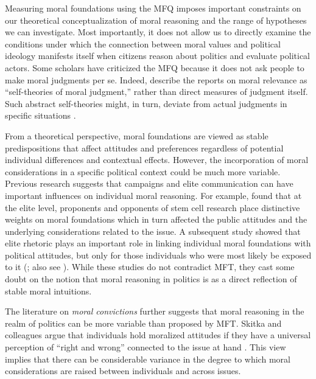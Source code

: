 \documentclass[12pt]{article}
\begin{document}
Measuring moral foundations using the MFQ imposes important constraints on our theoretical conceptualization of moral reasoning and the range of hypotheses we can investigate. Most importantly, it does not allow us to directly examine the conditions under which the connection between moral values and political ideology manifests itself when citizens reason about politics and evaluate political actors. Some scholars have criticized the MFQ because it does not ask people to make moral judgments per se. Indeed, \citet[1031]{graham2009liberals} describe the reports on moral relevance as ``self-theories of moral judgment,'' rather than direct measures of judgment itself. Such abstract self-theories might, in turn, deviate from actual judgments in specific situations \citep[see][for an alternative way to measure moral judgment]{clifford2015moral}.

From a theoretical perspective, moral foundations are viewed as stable predispositions that affect attitudes and preferences regardless of potential individual differences and contextual effects. However, the incorporation of moral considerations in a specific political context could be much more variable. Previous research suggests that campaigns and elite communication can have important influences on individual moral reasoning. For example, \citet{clifford2013words} found that at the elite level, proponents and opponents of stem cell research place distinctive weights on moral foundations which in turn affected the public attitudes and the underlying considerations related to the issue. A subsequent study showed that elite rhetoric plays an important role in linking individual moral foundations with political attitudes, but only for those individuals who were most likely be exposed to it (\citealt{clifford2015concerns}; also see \citealt{day2014shifting}). While these studies do not contradict MFT, they cast some doubt on the notion that moral reasoning in politics is as a direct reflection of stable moral intuitions. 

The literature on \textit{moral convictions} further suggests that moral reasoning in the realm of politics can be more variable than proposed by MFT. Skitka and colleagues argue that individuals hold moralized attitudes if they have a universal perception of ``right and wrong'' connected to the issue at hand \citep{skitka2005moral,mullen2006exploring,skitka2010psychology}. This view implies that there can be considerable variance in the degree to which moral considerations are raised between individuals and across issues.
\end{document}
